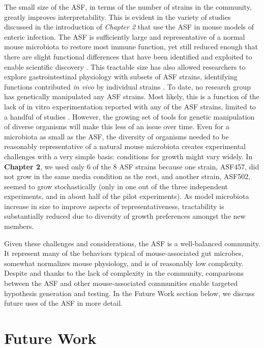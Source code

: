 \documentclass[11pt,twocolumn,notitlepage,openany,twoside]{book}
\begin{document}
\begin{refsection}
The small size of the ASF, in terms of the number of strains in the community, greatly improves interpretability. This is evident in the variety of studies discussed in the introduction of \textit{Chapter 2} that use the ASF in mouse models of enteric infection. The ASF is sufficiently large and representative of a normal mouse microbiota to restore most immune function, yet still reduced enough that there are slight functional differences that have been identified and exploited to enable scientific discovery \cite{Ivanov2008-cl}. This tractable size has also allowed researchers to explore gastrointestinal physiology with subsets of ASF strains, identifying functions contributed \textit{in vivo} by individual strains \cite{Brugiroux2016-vi}. To date, no research group has genetically manipulated any ASF strains. Most likely, this is a function of the lack of in vitro experimentation reported with any of the ASF strains, limited to a handful of studies \cite{Biggs2017-fs,Loy2017-rb,Medlock2018-ub}. However, the growing set of tools for genetic manipulation of diverse organisms will make this less of an issue over time. Even for a microbiota as small as the ASF, the diversity of organisms needed to be reasonably representative of a natural mouse microbiota creates experimental challenges with a very simple basis: conditions for growth might vary widely. In \textbf{Chapter 2}, we used only 6 of the 8 ASF strains because one strain, ASF457, did not grow in the same media condition as the rest, and another strain, ASF502, seemed to grow stochastically (only in one out of the three independent experiments, and in about half of the pilot experiments). As model microbiota increase in size to improve aspects of representativeness, tractability is substantially reduced due to diversity of growth preferences amongst the new members.

Given these challenges and considerations, the ASF is a well-balanced community. It represent many of the behaviors typical of mouse-associated gut microbes, somewhat normalizes mouse physiology, and is of reasonably low complexity. Despite and thanks to the lack of complexity in the community, comparisons between the ASF and other mouse-associated communities enable targeted hypothesis generation and testing. In the Future Work section below, we discuss future uses of the ASF in more detail.

\section{Future Work}

\end{refsection}
\end{document}
